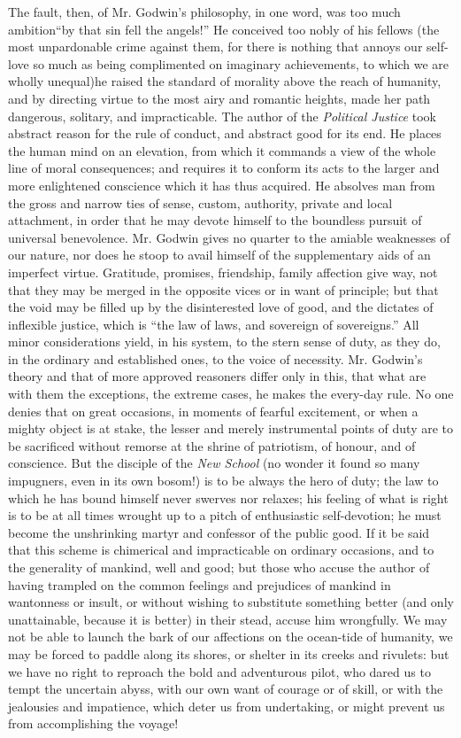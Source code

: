 The fault, then, of Mr. Godwin's philosophy, in one word, was too
much ambition\textemdash ``by that sin fell the angels!'' He
conceived too nobly of his fellows (the most unpardonable crime
against them, for there is nothing that annoys our self-love so
much as being complimented on imaginary achievements, to which we
are wholly unequal)\textemdash he raised the standard of morality
above the reach of humanity, and by directing virtue to the most
airy and romantic heights, made her path dangerous, solitary, and
impracticable. The author of the \emph{Political Justice} took
abstract reason for the rule of conduct, and abstract good for its
end. He places the human mind on an elevation, from which it
commands a view of the whole line of moral consequences; and
requires it to conform its acts to the larger and more enlightened
conscience which it has thus acquired.  He absolves man from the
gross and narrow ties of sense, custom, authority, private and
local attachment, in order that he may devote himself to the
boundless pursuit of universal benevolence. Mr. Godwin gives no
quarter to the amiable weaknesses of our nature, nor does he stoop
to avail himself of the supplementary aids of an imperfect virtue.
Gratitude, promises, friendship, family affection give way, not
that they may be merged in the opposite vices or in want of
principle; but that the void may be filled up by the disinterested
love of good, and the dictates of inflexible justice, which is
``the law of laws, and sovereign of sovereigns.'' All minor
considerations yield, in his system, to the stern sense of duty,
as they do, in the ordinary and established ones, to the voice of
necessity. Mr. Godwin's theory and that of more approved reasoners
differ only in this, that what are with them the exceptions, the
extreme cases, he makes the every-day rule. No one denies that on
great occasions, in moments of fearful excitement, or when a
mighty object is at stake, the lesser and merely instrumental
points of duty are to be sacrificed without remorse at the shrine
of patriotism, of honour, and of conscience. But the disciple of
the \emph{New School} (no wonder it found so many impugners, even
in its own bosom!)  is to be always the hero of duty; the law to
which he has bound himself never swerves nor relaxes; his feeling
of what is right is to be at all times wrought up to a pitch of
enthusiastic self-devotion; he must become the unshrinking martyr
and confessor of the public good. If it be said that this scheme
is chimerical and impracticable on ordinary occasions, and to the
generality of mankind, well and good; but those who accuse the
author of having trampled on the common feelings and prejudices of
mankind in wantonness or insult, or without wishing to substitute
something better (and only unattainable, because it is better) in
their stead, accuse him wrongfully. We may not be able to launch
the bark of our affections on the ocean-tide of humanity, we may
be forced to paddle along its shores, or shelter in its creeks and
rivulets: but we have no right to reproach the bold and
adventurous pilot, who dared us to tempt the uncertain abyss, with
our own want of courage or of skill, or with the jealousies and
impatience, which deter us from undertaking, or might prevent us
from accomplishing the voyage!

